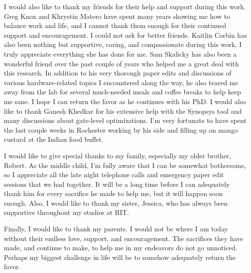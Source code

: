 \documentclass[11pt,american]{report}
\begin{document}
I would also like to thank my friends for their help and support during this work. Greg Knox and Khrystin Matero have spent many years showing me how to balance work and life, and I cannot thank them enough for their continued support and encouragement. I could not ask for better friends. Kaitlin Corbin has also been nothing but supportive, caring, and compassionate during this work. I truly appreciate everything she has done for me. Sam Skalicky has also been a wonderful friend over the past couple of years who helped me a great deal with this research. In addition to his very thorough paper edits and discussions of various hardware-related topics I encountered along the way, he also teared me away from the lab for several much-needed meals and coffee breaks to help keep me sane. I hope I can return the favor as he continues with his PhD. I would also like to thank Ganesh Khedkar for his extensive help with the Synopsys tool and many discussions about gate-level optimizations. I'm very fortunate to have spent the last couple weeks in Rochester working by his side and filling up on mango custard at the Indian food buffet. 

I would like to give special thanks to my family, especially my older brother, Robert. As the middle child, I'm fully aware that I can be somewhat bothersome, so I appreciate all the late night telephone calls and emergency paper edit sessions that we had together. It will be a long time before I can adequately thank him for every sacrifice he made to help me, but it will happen soon enough. Also, I would like to thank my sister, Jessica, who has always been supportive throughout my studies at RIT.

Finally, I would like to thank my parents. I would not be where I am today without their endless love, support, and encouragement. The sacrifices they have made, and continue to make, to help me in my endeavors do not go unnoticed. Perhaps my biggest challenge in life will be to somehow adequately return the favor.
\vfill

\newcommand{\etc} {\emph{etc.\/}}
\newcommand{\etal}{\emph{et~al.\/}}
\newcommand{\eg}  {\emph{e.g.\/}}
\newcommand{\ie}  {\emph{i.e.\/}}
\end{document}
